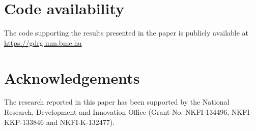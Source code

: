 \documentclass[preprint,12pt]{elsarticle}
\begin{document}
	
	\section*{Code availability}
	The code supporting the results presented in the paper is publicly available at \url{https://gdrg.mm.bme.hu}
	
	\section*{Acknowledgements}
	The research reported in this paper has been supported by the National Research, Development and Innovation Office (Grant No. NKFI-134496, NKFI-KKP-133846 and NKFI-K-132477).  
	
	
	
	 
	
	
\end{document}

